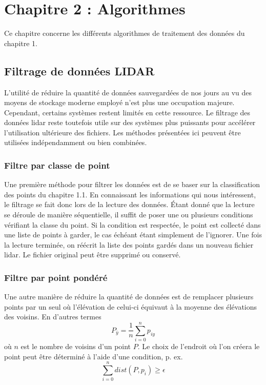 \chapter{Chapitre 2 : Algorithmes}

Ce chapitre concerne les différents algorithmes de traitement des données du chapitre 1.

\section{Filtrage de données LIDAR}

L'utilité de réduire la quantité de données sauvegardées de nos jours au vu des moyens de stockage moderne employé n'est plus une occupation majeure.
Cependant, certains systèmes restent limités en cette ressource.
Le filtrage des données \gls{lidar} reste toutefois utile sur des systèmes plus puissants pour accélérer l'utilisation ultérieure des fichiers. Les méthodes présentées ici peuvent être utilisées indépendamment ou bien combinées.

\subsection{Filtre par classe de point}
Une première méthode pour filtrer les données est de se baser sur la classification des points du chapitre 1.1. En connaissant les informations qui nous intéressent, le filtrage se fait donc lors de la lecture des données.
Étant donné que la lecture se déroule de manière séquentielle, il suffit de poser une ou plusieurs conditions vérifiant la classe du point.
Si la condition est respectée, le point est collecté dans une liste de points à garder, le cas échéant étant simplement de l'ignorer.
Une fois la lecture terminée, on réécrit la liste des points gardés dans un nouveau fichier \gls{lidar}.
Le fichier original peut être supprimé ou conservé.

\subsection{Filtre par point pondéré}

Une autre manière de réduire la quantité de données est de remplacer plusieurs points par un seul où l'élévation de celui-ci équivaut à la moyenne des élévations des voisins.
En d'autres termes $$ P_{\bar{y}} = \frac{1}{n} \sum_{i=0}^{n} p_{iy} $$
où $n$ est le nombre de voisins d'un point $P$. 
Le choix de l'endroit où l'on créera le point peut être déterminé à l'aide d'une condition, p. ex. $$\sum_{i=0}^n dist(P, p_i) \geq \epsilon$$

